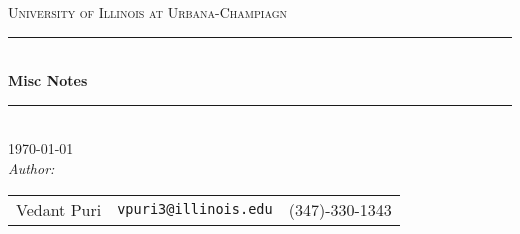 %
\begin{titlepage}
\newcommand{\HRule}{\rule{\linewidth}{0.5mm}}
\center
\textsc{\LARGE University of Illinois at Urbana-Champiagn}\\[1cm]
\HRule \\[0.4cm]

{ 
  \huge \bfseries Misc Notes \\[0.5cm]
}

\HRule \\[1cm]
{\Large \today}\\[1cm]
\emph{Author:}\\
\begin{tabular}{l r l}
  Vedant Puri         & \texttt{vpuri3@illinois.edu}  &  (347)-330-1343 \\
\end{tabular}\\[0.5cm]
\vfill
\end{titlepage}